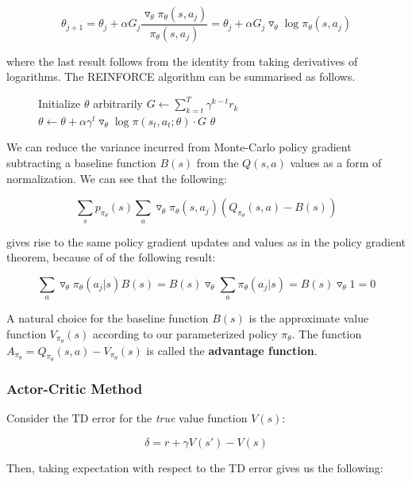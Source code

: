 \documentclass[11pt]{article}
\begin{document}
$$
\theta_{j+1} = \theta_j + \alpha G_j \frac{\triangledown_{\theta} \pi_{\theta}(s, a_j)}{\pi_{\theta}(s, a_j)} = \theta_j + \alpha G_j \triangledown_{\theta} \log \pi_{\theta}(s, a_j)
$$

where the last result follows from the identity from taking derivatives of logarithms. The REINFORCE algorithm can be summarised as follows.

\begin{figure}[!htb]
\begin{algorithmic}
\State Initialize $\theta$ arbitrarily
\State $G \leftarrow \sum^T_{k=t} \gamma^{k-t}r_k$
\State $\theta \leftarrow \theta + \alpha \gamma^t \triangledown_{\theta} \log \pi(s_t, a_t; \theta) \cdot G$ 
\EndFor
\EndFor
\State \Return $\theta$
\EndProcedure
\end{algorithmic}
\end{figure}

We can reduce the variance incurred from Monte-Carlo policy gradient subtracting a baseline function $B(s)$ from the $Q(s, a)$ values as a form of normalization. We can see that the following:

$$
\sum_s p_{\pi_{\theta}}(s) \sum_a \triangledown_{\theta} \pi_{\theta}(s, a_j)(Q_{\pi_{\theta}}(s, a) - B(s))
$$

gives rise to the same policy gradient updates and values as in the policy gradient theorem, because of of the following result:

$$
\sum_a \triangledown_{\theta} \pi_{\theta}(a_j|s) B(s) = B(s) \triangledown_{\theta} \sum_a \pi_{\theta}(a_j|s) = B(s) \triangledown_{\theta} 1 = 0
$$

A natural choice for the baseline function $B(s)$ is the approximate value function $V_{\pi_{\theta}}(s)$ according to our parameterized policy $\pi_{\theta}$. The function $A_{\pi_{\theta}} = Q_{\pi_{\theta}}(s, a) - V_{\pi_{\theta}}(s)$ is called the \textbf{advantage function}.

\subsubsection{Actor-Critic Method}

Consider the TD error for the \textit{true} value function $V(s)$: 

$$
\delta = r + \gamma V(s') - V(s)
$$

Then, taking expectation with respect to the TD error gives us the following:
\end{document}
